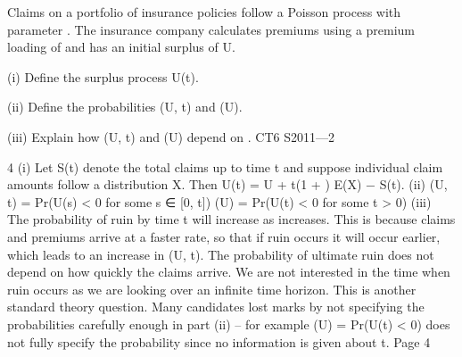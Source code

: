 
Claims on a portfolio of insurance policies follow a Poisson process with parameter \lambda .
The insurance company calculates premiums using a premium loading of \theta  and has an
initial surplus of U.
\item (i) Define the surplus process U(t). 
\item (ii) Define the probabilities \psi (U, t) and \psi (U). 
\item (iii) Explain how \psi (U, t) and \psi (U) depend on \lambda .
CT6 S2011—2





4
(i)
Let S(t) denote the total claims up to time t and suppose individual claim
amounts follow a distribution X.
Then U(t) = U + \lambda t(1 + \theta ) E(X) − S(t).
(ii)
\psi (U, t) = Pr(U(s) < 0 for some s ∈ [0, t])
\psi (U) = Pr(U(t) < 0 for some t > 0)
(iii)
The probability of ruin by time t will increase as \lambda  increases. This is because
claims and premiums arrive at a faster rate, so that if ruin occurs it will occur
earlier, which leads to an increase in \psi (U, t).
The probability of ultimate ruin does not depend on how quickly the claims
arrive. We are not interested in the time when ruin occurs as we are looking
over an infinite time horizon.
This is another standard theory question. Many candidates lost marks by not specifying the
probabilities carefully enough in part (ii) – for example \psi  (U) = Pr(U(t) < 0) does not fully
specify the probability since no information is given about t.
Page 4%

